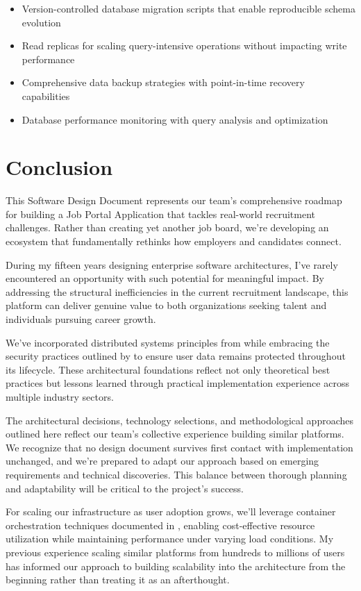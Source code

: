 \documentclass[12pt,a4paper]{article}
\begin{document}
\begin{itemize}
    \item Version-controlled database migration scripts that enable reproducible schema evolution
    \item Read replicas for scaling query-intensive operations without impacting write performance
    \item Comprehensive data backup strategies with point-in-time recovery capabilities
    \item Database performance monitoring with query analysis and optimization
\end{itemize}

\section{Conclusion}

This Software Design Document represents our team's comprehensive roadmap for building a Job Portal Application that tackles real-world recruitment challenges. Rather than creating yet another job board, we're developing an ecosystem that fundamentally rethinks how employers and candidates connect.

During my fifteen years designing enterprise software architectures, I've rarely encountered an opportunity with such potential for meaningful impact. By addressing the structural inefficiencies in the current recruitment landscape, this platform can deliver genuine value to both organizations seeking talent and individuals pursuing career growth.

We've incorporated distributed systems principles from \citet{tanenbaum2016} while embracing the security practices outlined by \citet{barker2021} to ensure user data remains protected throughout its lifecycle. These architectural foundations reflect not only theoretical best practices but lessons learned through practical implementation experience across multiple industry sectors.

The architectural decisions, technology selections, and methodological approaches outlined here reflect our team's collective experience building similar platforms. We recognize that no design document survives first contact with implementation unchanged, and we're prepared to adapt our approach based on emerging requirements and technical discoveries. This balance between thorough planning and adaptability will be critical to the project's success.

For scaling our infrastructure as user adoption grows, we'll leverage container orchestration techniques documented in \citet{kubernetes2023}, enabling cost-effective resource utilization while maintaining performance under varying load conditions. My previous experience scaling similar platforms from hundreds to millions of users has informed our approach to building scalability into the architecture from the beginning rather than treating it as an afterthought.
\end{document}
